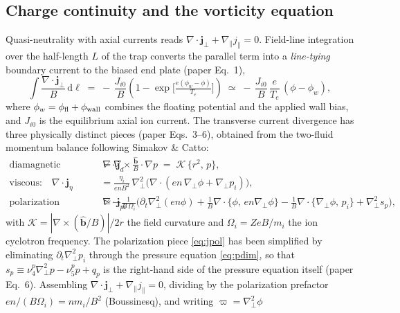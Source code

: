 \documentclass[11pt]{article}
\newcommand{\pb}[2]{\{#1,\,#2\}}
\newcommand{\bhat}{\hat{\bm{b}}}
\newcommand{\gradperp}{\nabla_{\!\perp}}
\begin{document}
\subsection{Charge continuity and the vorticity equation}
Quasi-neutrality with axial currents reads $\nabla\!\cdot\!\bm{j}_\perp +
\nabla_\parallel j_\parallel = 0$. Field-line integration over the half-length
$L$ of the trap converts the parallel term into a \emph{line-tying} boundary
current to the biased end plate (paper Eq.~1),
\begin{equation}
  \int \frac{\nabla\!\cdot\!\bm{j}_\perp}{B}\,\mathrm{d}\ell
    \;=\; -\,\frac{J_{i0}}{B}\!\left(1-\exp\!\Big[\tfrac{e(\phi_w-\phi)}{T_e}\Big]\right)
    \;\simeq\; -\,\frac{J_{i0}}{B}\,\frac{e}{T_e}\,(\phi-\phi_w),
  \label{eq:linetie}
\end{equation}
where $\phi_w=\phi_{\rm fl}+\phi_{\rm wall}$ combines the floating potential and
the applied wall bias, and $J_{i0}$ is the equilibrium axial ion current. The
transverse current divergence has three physically distinct pieces (paper
Eqs.~3--6), obtained from the two-fluid momentum balance following Simakov \&
Catto:
\begin{align}
  \text{diamagnetic (curvature):}\quad
  \nabla\!\cdot\!\bm{j}_d &= \nabla\!\times\!\tfrac{\bhat}{B}\cdot\nabla p
     \;=\; \mathcal{K}\,\pb{r^2}{p},
  \label{eq:jd}\\[2pt]
  \text{viscous:}\quad
  \nabla\!\cdot\!\bm{j}_\eta &= \tfrac{\eta_i}{e n B^2}\,\gradperp^2\!
     \big(\nabla\!\cdot(e n\,\gradperp\phi + \gradperp p_i)\big),
  \label{eq:jeta}\\[2pt]
  \text{polarization (inertia):}\quad
  \nabla\!\cdot\!\bm{j}_{pi} &\simeq -\frac{1}{B\,\Omega_i}
     \Big(\partial_t\gradperp^2(e n\phi)
       + \tfrac{1}{B}\nabla\!\cdot\!\pb{\phi}{en\gradperp\phi}
       - \tfrac{1}{B}\nabla\!\cdot\!\pb{\gradperp\phi}{p_i}
       + \gradperp^2 s_p\Big),
  \label{eq:jpol}
\end{align}
with $\mathcal{K}=|\nabla\!\times\!(\bhat/B)|/2r$ the field curvature and
$\Omega_i=ZeB/m_i$ the ion cyclotron frequency. The polarization piece
\eqref{eq:jpol} has been simplified by eliminating $\partial_t\gradperp^2 p_i$
through the pressure equation \eqref{eq:pdim}, so that $s_p\equiv
\nu_4^p\gradperp^2 p-\nu_5^p p+q_p$ is the right-hand side of the pressure
equation itself (paper Eq.~6). Assembling $\nabla\!\cdot\!\bm{j}_\perp +
\nabla_\parallel j_\parallel = 0$, dividing by the polarization prefactor
$e n/(B\Omega_i)=n m_i/B^2$ (Boussinesq), and writing $\varpi=\gradperp^2\phi$
\end{document}
